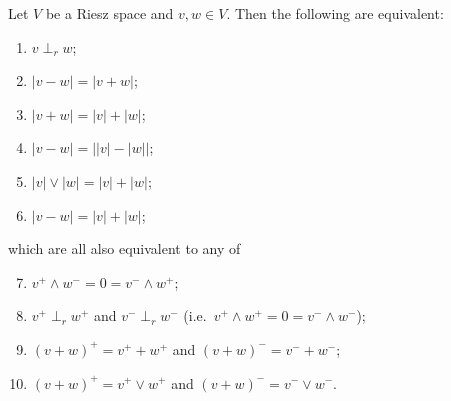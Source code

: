\begin{proposition} \label{RieszDisjointEquivalents}
Let $V$ be a Riesz space and $v,w\in V$. Then the following are equivalent:
\begin{enumerate}
\item $v\perp_r w$;
\item $|v-w| = |v+w|$;
\item $|v+w| = |v|+|w|$;
\item $|v-w| = \big||v|-|w|\big|$;
\item $|v|\vee |w| = |v|+|w|$;
\item $|v-w| = |v|+|w|$;
\end{enumerate}
which are all also equivalent to any of
\begin{enumerate} \setcounter{enumi}{6}
\item $v^+\wedge w^- = 0 = v^- \wedge w^+$;
\item $v^+\perp_r w^+$ and $v^-\perp_r w^-$ (i.e.\ $v^+\wedge w^+ = 0 = v^- \wedge w^-$);
\item $(v+w)^+ = v^++w^+$ and $(v+w)^- = v^- + w^-$;
\item $(v+w)^+ = v^+\vee w^+$ and $(v+w)^- = v^- \vee w^-$.
\end{enumerate}
\end{proposition}
